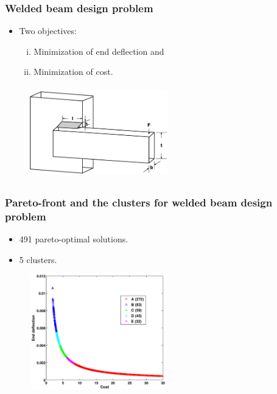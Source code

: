 \documentclass[svgnames, table, smaller]{beamer}
\begin{document}
\begin{frame}[allowframebreaks]
  \frametitle{Welded beam design problem}
  
  \begin{itemize}

  \item Two objectives:
    \begin{enumerate}[(i)]
    \item Minimization of end deflection and
    \item Minimization of cost.
    \end{enumerate}
  \end{itemize}


  \begin{figure}[ht]\begin{center}
      \includegraphics[width=60mm, height=40mm]{dia/wbeam.eps}
      \label{wbeam}
    \end{center}
  \end{figure}


\end{frame}





\begin{frame}
  \frametitle{Pareto-front and the clusters for welded beam design problem}

  \begin{itemize}
    \item 491 pareto-optimal solutions.
    \item 5 clusters.
  \end{itemize}

  \begin{figure}[ht]
    \begin{center}
      \includegraphics[width=60mm, height=50mm]{dia/wbeamParetoClusters.eps}
      \label{wbeam}
    \end{center}
  \end{figure}


\end{frame}
\end{document}
